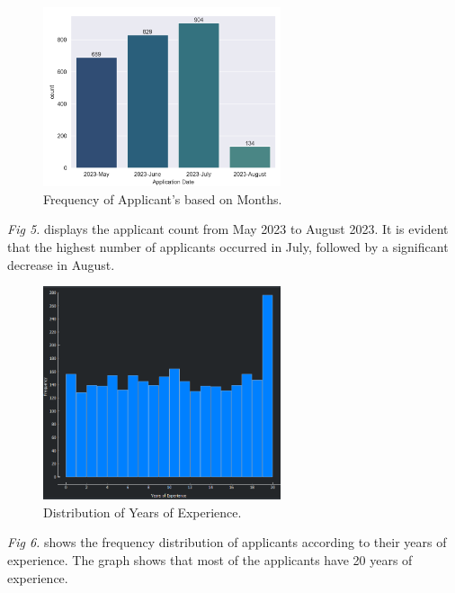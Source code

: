 \documentclass[journal]{IEEEtai}
\begin{document}
\begin{figure}[htbp]
\centerline{\includegraphics[width=16.5pc]{figures/applicantdate-N.png}}
\caption{Frequency of Applicant’s based on Months.}
\end{figure}

{\it Fig 5.} displays the applicant count from May 2023 to August 2023. It is evident that the highest number of applicants occurred in July, followed by a significant decrease in August.
\clearpage


\begin{figure}
\centerline{\includegraphics[width=16.5pc]{figures/Distribution-YearsOfExperience.png}}
\caption{Distribution of Years of Experience.}
\end{figure}
{\it Fig 6.} shows the frequency distribution of applicants according to their years of experience. The graph shows that most of the applicants have 20 years of experience.
\end{document}
